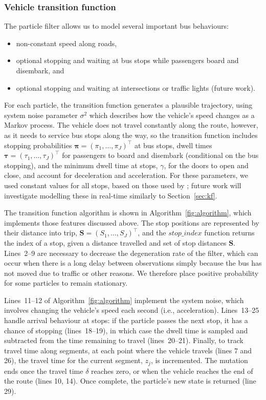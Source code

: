 \subsubsection{Vehicle transition function}
\label{sec:pf_prediction}

The particle filter allows us to model several important bus behaviours:
\begin{itemize}
\item non-constant speed along roads,
\item optional stopping and waiting at bus stops while passengers board and disembark, and
\item optional stopping and waiting at intersections or traffic lights (future work).
\end{itemize}

For each particle, the transition function generates a plausible trajectory,
using system noise parameter $\sigma^2$ which describes 
how the vehicle's speed changes as a Markov process.
The vehicle does not travel constantly along the route,
however, as it needs to service bus stops along the way,
so the transition function includes 
stopping probabilities $\boldsymbol\pi = (\pi_1,\ldots,\pi_J)^\top$ at bus stops,
dwell times $\boldsymbol\tau = (\tau_1,\ldots,\tau_J)^\top$ for passengers to
board and disembark (conditional on the bus stopping),
and the minimum dwell time at stops, $\gamma$,
for the doors to open and close,
and account for deceleration and acceleration.
For these parameters, we used constant values for all stops,
based on those used by \cite{Hans_2015};
future work will investigate modelling these in real-time similarly to Section~\ref{sec:kf}.

The transition function algorithm is shown in Algorithm~\ref{fig:algorithm},
which implements those features discussed above.
The stop positions are represented by their distance into trip,
$\boldsymbol{S} = (S_1, \ldots, S_J)^\top$, and
the $stop\_index$ function returns the index of a stop,
given a distance travelled and set of stop distances $\boldsymbol{S}$.
Lines~2--9 are necessary to decrease the degeneration rate of the filter,
which can occur when there is a long delay between observations
simply because the bus has not moved due to traffic or other reasons. 
We therefore place positive probability for some particles to remain stationary.

Lines~11--12 of Algorithm~\ref{fig:algorithm} implement the system noise,
which involves changing the vehicle's speed each second (i.e., acceleration).
Lines~13--25 handle arrival behaviour at stops:
if the particle passes the next stop,
it has a chance of stopping (lines~18--19),
in which case the dwell time is sampled and subtracted from the 
time remaining to travel (lines~20--21).
Finally, to track travel time along segments,
at each point where the vehicle travels (lines 7 and 26),
the travel time for the current segment, $z_j$, is incremented.
The mutation ends once the travel time $\delta$ reaches zero,
or when the vehicle reaches the end of the route (lines 10, 14).
Once complete, the particle's new state is returned (line 29).

